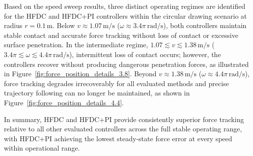 \documentclass[
	german,%
	accentcolor=9c,%
	ruledheaders=section,%
	class=report,%
	thesis={type=bachelor},%
	fontsize=11pt,%
	parskip=half-,%
	custommargins=true,%
	marginpar=false,%
]{tudapub}
\begin{document}
Based on the speed sweep results, three distinct operating regimes are identified 
for the HFDC and HFDC+PI controllers within the circular drawing scenario at 
radius $r = 0.1\,\mathrm{m}$. Below $v \approx 1.07\,\mathrm{m/s}$ 
($\omega \approx 3.4\pi\,\mathrm{rad/s}$), both controllers maintain stable 
contact and accurate force tracking without loss of contact or excessive surface 
penetration. In the intermediate regime, 
$1.07 \lesssim v \lesssim 1.38\,\mathrm{m/s}$ 
($3.4\pi \lesssim \omega \lesssim 4.4\pi\,\mathrm{rad/s}$), intermittent loss 
of contact occurs; however, the controllers recover without producing dangerous 
penetration forces, as illustrated in Figure~\ref{fig:force_position_details_3.8}. 
Beyond $v \approx 1.38\,\mathrm{m/s}$ ($\omega \approx 4.4\pi\,\mathrm{rad/s}$), 
force tracking degrades irrecoverably for all evaluated methods and precise 
trajectory following can no longer be maintained, as shown in 
Figure~\ref{fig:force_position_details_4.4}.

In summary, HFDC and HFDC+PI provide consistently superior force tracking 
relative to all other evaluated controllers across the full stable operating 
range, with HFDC+PI achieving the lowest steady-state force error at every speed within operational range.
\end{document}
